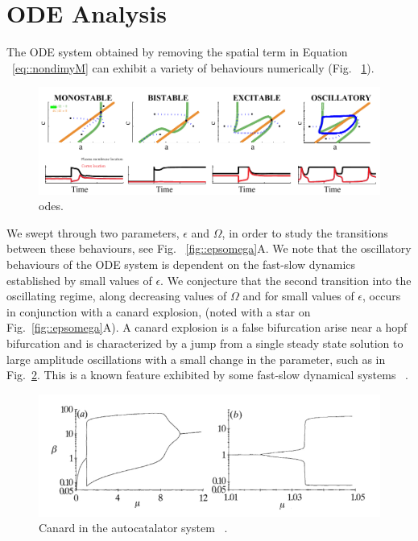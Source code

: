 \section{ODE Analysis}

The ODE system obtained by removing the spatial term in Equation ~\ref{eq::nondimyM} can exhibit a variety of behaviours numerically (Fig. ~\ref{fig::odeanal}). 
\begin{figure}[h]
\centering
\captionsetup{width=\linewidth}
\includegraphics[width=4.5in]{Project2/figs/ODE_Analysis.pdf}
\caption{odes.}
\label{fig::odeanal}
\end{figure}

We swept through two parameters, $\epsilon$ and $\Omega$, in order to study the transitions between these behaviours, see Fig. ~\ref{fig::epsomega}A. We note that the oscillatory behaviours of the ODE system is dependent on the fast-slow dynamics established by small values of $\epsilon$. We conjecture that the second transition into the oscillating regime, along decreasing values of $\Omega$ and for small values of $\epsilon$, occurs in conjunction with a canard explosion, (noted with a star on Fig.~\ref{fig::epsomega}A). A canard explosion is a false bifurcation arise near a hopf bifurcation and is characterized by a jump from a single steady state solution to large amplitude oscillations with a small change in the parameter, such as in Fig.~\ref{fig::canard}. This is a known feature exhibited by some fast-slow dynamical systems ~\cite{Peng1991}.

\begin{figure}[h]
\centering
\captionsetup{width=\linewidth}
\includegraphics[width=4.5in]{Project2/figs/canardfrompaper.pdf}
\caption{Canard in the autocatalator system ~\cite{Peng1991}.}
\label{fig::canard}
\end{figure}



